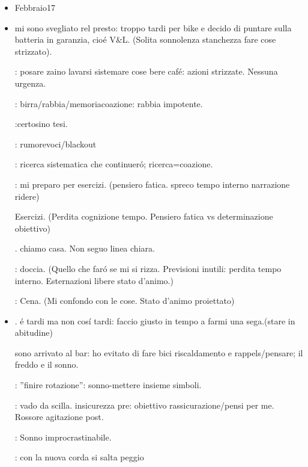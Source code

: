 \begin{itemize}

\item Febbraio17

\item {}
mi sono svegliato rel presto: troppo tardi per bike e decido di puntare sulla batteria in garanzia, cio\'e V\&L. (Solita sonnolenza stanchezza fare cose strizzato).

: posare zaino lavarsi sistemare cose bere caf\'e: azioni strizzate. Nessuna urgenza.

: birra/rabbia/memoriacoazione: rabbia impotente.

:certosino tesi.

: rumorevoci/blackout

: ricerca sistematica che continuer\'o; ricerca=coazione.

: mi preparo per esercizi. (pensiero fatica. spreco tempo interno narrazione ridere)

 Esercizi. (Perdita cognizione tempo. Pensiero fatica vs determinazione obiettivo)

. chiamo casa. Non seguo linea chiara.

: doccia. (Quello che far\'o se mi si rizza. Previsioni inutili: perdita tempo interno. Esternazioni libere stato d'animo.)

: Cena. (Mi confondo con le cose. Stato d'animo proiettato)

\item {}.   \'e tardi ma non cos\'i tardi: faccio giusto in tempo a farmi una sega.(stare in abitudine)

 sono arrivato al bar: ho evitato di fare bici riscaldamento e rappels/pensare; il freddo e il sonno.

: ''finire rotazione'': sonno-mettere insieme simboli.

: vado da scilla. insicurezza pre: obiettivo rassicurazione/pensi per me. Rossore agitazione post.

: Sonno improcrastinabile.

: con la nuova corda si salta peggio


\end{itemize}
